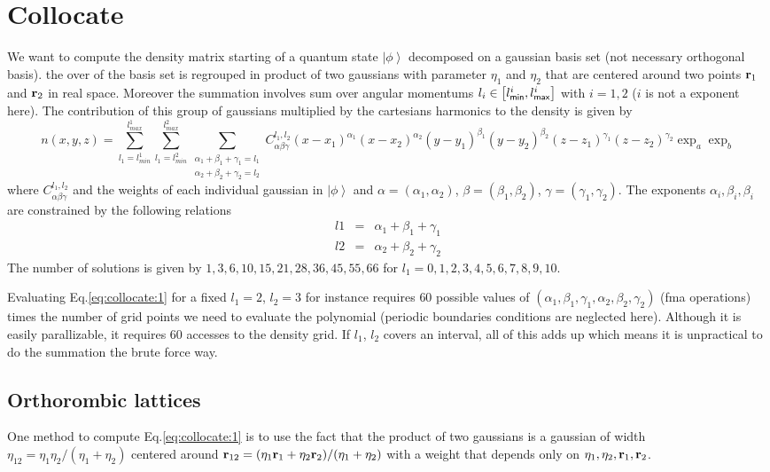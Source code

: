 \documentclass[prb]{revtex4}
\begin{document}
\section{Collocate}\label{sec:collocate}
We want to compute the density matrix starting of a quantum state
$\left|\phi\right>$ decomposed on a gaussian basis set (not necessary orthogonal
basis). the over of the basis set is regrouped in product of two gaussians with
parameter $\eta_1$ and $\eta_2$ that are centered around two points ${\bf r}_1$
and ${\bf r}_2$ in real space. Moreover the summation involves sum over angular
momentums $l_i\in\left[l_{\sf min}^i, l_{\sf max}^i\right]$ with $i=1,2$ ($i$ is
not a exponent here). The contribution of this group of gaussians multiplied by
the cartesians harmonics to the density is given by
\begin{equation}
  \label{eq:collocate:1}
  n(x,y,z) = \sum_{l_1 = l_{min}^1}^{l_{max}^1} \sum_{l_1 = l_{min}^2}^{l_{max}^2} \sum_{\substack{\alpha_1 + \beta_1 + \gamma_1 = l_1\\\alpha_2 + \beta_2 + \gamma_2 = l_2}} C^{l_1,l_2}_{\alpha\beta\gamma} (x-x_1)^{\alpha_1} (x-x_2)^{\alpha_2}(y-y_1)^{\beta_1} (y-y_2)^{\beta_2}(z-z_1)^{\gamma_1} (z-z_2)^{\gamma_2} \exp_a\exp_b
\end{equation}
where $C^{l_1,l_2}_{\alpha\beta\gamma}$ and the weights of each individual
gaussian in $\left|\phi\right>$ and $\alpha=(\alpha_1,\alpha_2)$,
$\beta=(\beta_1,\beta_2)$, $\gamma=(\gamma_1,\gamma_2)$. The exponents
$\alpha_i,\beta_i,\beta_i$ are constrained by the following relations
\begin{eqnarray}
  \label{eq:collocate:2a}
  l1 &=& \alpha_1 + \beta_1 + \gamma_1\\
  \label{eq:collocate:2b}
  l2 &=& \alpha_2 + \beta_2 + \gamma_2
\end{eqnarray}
The number of solutions is given by $1, 3, 6, 10, 15, 21, 28, 36, 45, 55, 66$
for $l_1 = 0, 1, 2, 3, 4, 5, 6, 7, 8, 9, 10$.

Evaluating Eq.\ref{eq:collocate:1} for a fixed $l_1 = 2$, $l_2 = 3$ for instance requires
$60$ possible values of $(\alpha_1,\beta_1,\gamma_1,\alpha_2,\beta_2,\gamma_2)$
(fma operations) times the number of grid points we need to evaluate the
polynomial (periodic boundaries conditions are neglected here). Although it is
easily parallizable, it requires 60 accesses to the density grid. If $l_1$,
$l_2$ covers an interval, all of this adds up which means it is unpractical to
do the summation the brute force way.

\subsection{Orthorombic lattices}
One method to compute Eq.\ref{eq:collocate:1} is to use the fact that the
product of two gaussians is a gaussian of width $\eta_{12} =
\eta_1\eta_2/(\eta_1 + \eta_2)$ centered around ${\bf r}_{12} = (\eta_1 {\bf
  r}_1 + \eta_2 {\bf r}_2)/ (\eta_1 + \eta_2)$ with a weight that depends only
on $\eta_1,\eta_2,{\bf r}_1,{\bf r}_2$.
\end{document}
